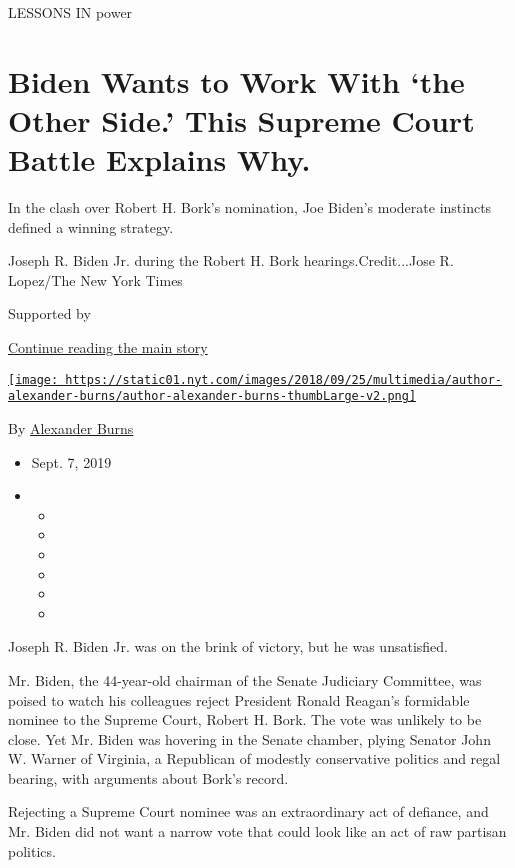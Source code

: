LESSONS IN power

\hypertarget{biden-wants-to-work-with-the-other-side-this-supreme-court-battle-explains-why}{%
\section{Biden Wants to Work With `the Other Side.' This Supreme Court
Battle Explains
Why.}\label{biden-wants-to-work-with-the-other-side-this-supreme-court-battle-explains-why}}

In the clash over Robert H. Bork's nomination, Joe Biden's moderate
instincts defined a winning strategy.

Joseph R. Biden Jr. during the Robert H. Bork hearings.Credit...Jose R.
Lopez/The New York Times

Supported by

\protect\hyperlink{after-sponsor}{Continue reading the main story}

\href{https://www.nytimes.com/by/alexander-burns}{\texttt{[image: https://static01.nyt.com/images/2018/09/25/multimedia/author-alexander-burns/author-alexander-burns-thumbLarge-v2.png]}}

By \href{https://www.nytimes.com/by/alexander-burns}{Alexander Burns}

\begin{itemize}
\item
  Sept. 7, 2019
\item
  \begin{itemize}
  \item
  \item
  \item
  \item
  \item
  \item
  \end{itemize}
\end{itemize}

Joseph R. Biden Jr. was on the brink of victory, but he was unsatisfied.

Mr. Biden, the 44-year-old chairman of the Senate Judiciary Committee,
was poised to watch his colleagues reject President Ronald Reagan's
formidable nominee to the Supreme Court, Robert H. Bork. The vote was
unlikely to be close. Yet Mr. Biden was hovering in the Senate chamber,
plying Senator John W. Warner of Virginia, a Republican of modestly
conservative politics and regal bearing, with arguments about Bork's
record.

Rejecting a Supreme Court nominee was an extraordinary act of defiance,
and Mr. Biden did not want a narrow vote that could look like an act of
raw partisan politics.

